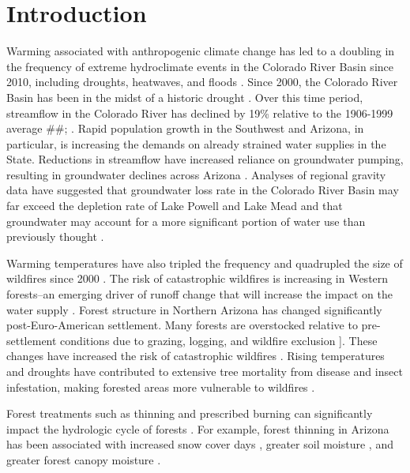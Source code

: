 \documentclass[
  number,
  preprint,
  3p,
  onecolumn]{elsarticle}
\begin{document}
\section{Introduction}\label{sec-intro}

Warming associated with anthropogenic climate change has led to a
doubling in the frequency of extreme hydroclimate events in the Colorado
River Basin since 2010, including droughts, heatwaves, and floods
\citep{bennett_concurrent_2021}. Since 2000, the Colorado River Basin
has been in the midst of a historic drought
\citep{meko_treering_2022, williams_rapid_2022}. Over this time period,
streamflow in the Colorado River has declined by 19\% relative to the
1906-1999 average \#\#;
\citep{hogan_recent_2024, udall_twentyfirst_2017}. Rapid population
growth in the Southwest and Arizona, in particular, is increasing the
demands on already strained water supplies in the State. Reductions in
streamflow have increased reliance on groundwater pumping, resulting in
groundwater declines across Arizona \citep{tadych_historical_2024}.
Analyses of regional gravity data have suggested that groundwater loss
rate in the Colorado River Basin may far exceed the depletion rate of
Lake Powell and Lake Mead and that groundwater may account for a more
significant portion of water use than previously thought
\citep{castle2014}.

Warming temperatures have also tripled the frequency and quadrupled the
size of wildfires since 2000 \citep{iglesias2022}. The risk of
catastrophic wildfires is increasing in Western forests--an emerging
driver of runoff change that will increase the impact on the water
supply \citep{williams_rapid_2022}. Forest structure in Northern Arizona
has changed significantly post-Euro-American settlement. Many forests
are overstocked relative to pre-settlement conditions due to grazing,
logging, and wildfire exclusion
\citep{covington_southwestern_1994, friederici2013}{]}. These changes
have increased the risk of catastrophic wildfires \citep{allen2002}.
Rising temperatures and droughts have contributed to extensive tree
mortality from disease and insect infestation, making forested areas
more vulnerable to wildfires \citep{berner_tree_2017}.

Forest treatments such as thinning and prescribed burning can
significantly impact the hydrologic cycle of forests
\citep{del_campo_global_2022}. For example, forest thinning in Arizona
has been associated with increased snow cover days
\citep{sankey_multi-scale_2015, belmonte_uav-based_2021, donager_integrating_2021},
greater soil moisture \citep{belmonte_soil_2022, sankey_thinning_2022},
and greater forest canopy moisture \citep{sankey_regionalscale_2021}.
\end{document}
